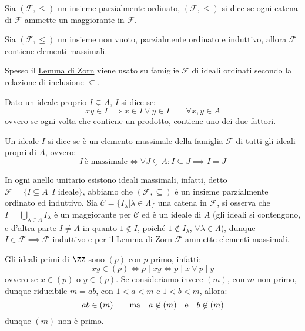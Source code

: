\documentclass[11pt]{scrartcl}
\begin{document}
\begin{definition}
    Sia $(\mathcal{F}, \leqslant)$ un insieme parzialmente ordinato, $(\mathcal{F}, \leqslant)$ si dice  se ogni catena di $\mathcal{F}$
    ammette un maggiorante in $\mathcal{F}$.
\end{definition}

\begin{lemma}
    \label{zorn}
    Sia $(\mathcal{F}, \leqslant)$ un insieme non vuoto, parzialmente ordinato e induttivo, allora $\mathcal{F}$ contiene elementi massimali.
\end{lemma}

\begin{remark}
    Spesso il \hyperref[zorn]{Lemma di Zorn} viene usato su famiglie $\mathcal{F}$ di ideali ordinati secondo la relazione di inclusione $\subseteq$.
\end{remark}

\begin{definition}
    Dato un ideale proprio $I \subsetneq A$, $I$ si dice  se:
        \[ xy \in I \implies x \in I \vee y \in I \qquad \forall x,y \in A
            \]
    ovvero se ogni volta che contiene un prodotto, contiene uno dei due fattori.
\end{definition}

\begin{definition}
    Un ideale $I$ si dice  se è un elemento massimale della famiglia $\mathcal{F}$ di tutti gli ideali propri di $A$, ovvero:
        \[ I \, \text{è massimale} \iff \forall J \subsetneq A : I \subseteq J \implies I = J
            \]
\end{definition}

In ogni anello unitario esistono ideali massimali, infatti, detto $\mathcal{F} = \{I \subsetneq A | \, \text{$I$ ideale}\}$, abbiamo che $(\mathcal{F}, \subseteq)$ è un insieme parzialmente ordinato ed induttivo.
Sia $\mathscr{C} = \{I_\lambda | \lambda \in \Lambda\}$ una catena in $\mathcal{F}$, si osserva che $I = \bigcup_{\lambda \in \Lambda}I_\lambda$ è un maggiorante per $\mathscr{C}$ ed è un ideale di $A$ (gli ideali si 
contengono, e d'altra parte $I \ne A$ in quanto $1 \not\in I$, poiché $1 \not \in I_\lambda$, $\forall \lambda \in \Lambda$), dunque $I \in \mathcal{F} \implies \mathcal{F}$ induttivo e per il \hyperref[zorn]{Lemma di Zorn} $\mathcal{F}$
ammette elementi massimali.

\begin{example}
    Gli ideali primi di $\ZZ$ sono $(p)$ con $p$ primo, infatti:
    \[ xy \in (p) \iff p \mid xy \iff p \mid x \vee p \mid y
        \]
    ovvero se $x \in (p)$ o $y \in (p)$. Se consideriamo invece $(m)$, con $m$ non primo, dunque riducibile $m = ab$, con $1<a<m$ e $1<b<m$, allora:
    \[ ab \in (m) \qquad \text{ma} \quad a \not\in (m) \quad \text e \quad b \not\in (m)
        \]
    dunque $(m)$ non è primo.
\end{example}
\end{document}
